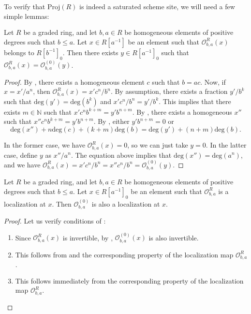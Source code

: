 \documentclass[reqno]{amsart}
\theoremstyle{definition}
\theoremstyle{remark}
\numberwithin{figure}{section}
\renewcommand{\deg}[1]{\mathrm{deg}(#1)}
\begin{document}
To verify that $\mathrm{Proj}(R)$ is indeed a saturated scheme site, we will need a few simple lemmas:

\begin{lem}
Let $R$ be a graded ring, and let $b,a \in R$ be homogeneous elements of positive degrees such that $b \leq a$.
Let $x \in R[a^{-1}]$ be an element such that $\mathcal{O}^R_{b,a}(x)$ belongs to $R[b^{-1}]_0$.
Then there exists $y \in R[a^{-1}]_0$ such that $\mathcal{O}^R_{b,a}(x) = \mathcal{O}^{(0)}_{b,a}(y)$.
\end{lem}
\begin{proof}
By , there exists a homogeneous element $c$ such that $b = a c$.
Now, if $x = x'/a^n$, then $\mathcal{O}^R_{b,a}(x) = x' c^n / b^n$.
By assumption, there exists a fraction $y'/b^k$ such that $\deg{y'} = \deg{b^k}$ and $x' c^n / b^n = y'/b^k$.
This implies that there exists $m \in \mathbb{N}$ such that $x' c^n b^{k+m} = y' b^{n+m}$.
By , there exists a homogeneous $x''$ such that $x'' c^n b^{k+m} = y' b^{n+m}$.
By , either $y' b^{n+m} = 0$ or
\[ \deg{x''} + n \deg{c} + (k + m) \deg{b} = \deg{y'} + (n + m) \deg{b}. \]

In the former case, we have $\mathcal{O}^R_{b,a}(x) = 0$, so we can just take $y = 0$.
In the latter case, define $y$ as $x'' / a^n$.
The equation above implies that $\deg{x''} = \deg{a^n}$, and we have $\mathcal{O}^R_{b,a}(x) = x' c^n / b^n = x'' c^n / b^n = \mathcal{O}^{(0)}_{b,a}(y)$.
\end{proof}

\begin{lem}
Let $R$ be a graded ring, and let $b,a \in R$ be homogeneous elements of positive degrees such that $b \leq a$.
Let $x \in R[a^{-1}]_0$ be an element such that $\mathcal{O}^R_{b,a}$ is a localization at $x$.
Then $\mathcal{O}^{(0)}_{b,a}$ is also a localization at $x$.
\end{lem}
\begin{proof}
Let us verify conditions of :
\begin{enumerate}
\item Since $\mathcal{O}^R_{b,a}(x)$ is invertible, by , $\mathcal{O}^{(0)}_{b,a}(x)$ is also invertible.
\item This follows from  and the corresponding property of the localization map $\mathcal{O}^R_{b,a}$.
\item This follows immediately from the corresponding property of the localization map $\mathcal{O}^R_{b,a}$.
\end{enumerate}
\end{proof}
\end{document}
